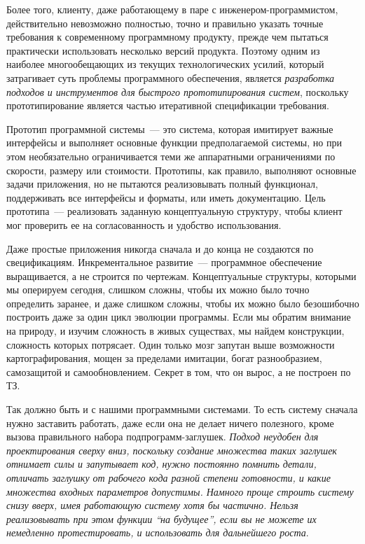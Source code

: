 Более того, клиенту, даже работающему в паре с инженером-програм\-мистом,
действительно невозможно полностью, точно и правильно указать точные требования
к современному программному продукту, прежде чем пытаться практически
использовать несколько версий продукта. Поэтому одним из наиболее многообещающих
из текущих технологических усилий, который затрагивает суть проблемы
программного обеспечения, является \emph{разработка подходов и инструментов для
быстрого прототипирования систем}, поскольку прототипирование является частью
итеративной спецификации требования.

Прототип программной системы\ --- это система, которая имитирует важные
интерфейсы и выполняет основные функции предполагаемой системы, но при этом
необязательно ограничивается теми же аппаратными ограничениями по скорости,
размеру или стоимости. Прототипы, как правило, выполняют основные задачи
приложения, но не пытаются реализовывать полный функционал, поддерживать все
интерфейсы и форматы, или иметь документацию. Цель прототипа\ --- реализовать
заданную концептуальную структуру, чтобы клиент мог проверить ее на
согласованность и удобство использования.

Даже простые приложения никогда сначала и до конца не создаются по
свецификациям. Инкрементальное развитие\ --- программное обеспечение
выращивается, а не строится по чертежам. Концептуальные структуры, которыми мы
оперируем сегодня, слишком сложны, чтобы их можно было точно определить заранее,
и даже слишком сложны, чтобы их можно было безошибочно построить даже за один
цикл эволюции программы. Если мы обратим внимание на природу, и изучим сложность
в живых существах, мы найдем конструкции, сложность которых потрясает. Один
только мозг запутан выше возможности картографирования, мощен за пределами
имитации, богат разнообразием, самозащитой и самообновлением. Секрет в том, что
он вырос, а не построен по ТЗ.

Так должно быть и с нашими программными системами. То есть систему сначала нужно
заставить работать, даже если она не делает ничего полезного, кроме вызова
правильного набора подпрограмм-заглушек. \textit{Подход неудобен для
проектирования сверху вниз, поскольку создание множества таких заглушек отнимает
силы и запутывает код, нужно постоянно помнить детали, отличать заглушку от
рабочего кода разной степени готовности, и какие множества входных параметров
допустимы. Намного проще строить систему снизу вверх, имея работающую систему
хотя бы частично. Нельзя реализовывать при этом функции ``на будущее'', если вы
не можете их немедленно протестировать, и использовать для дальнейшего роста}.
